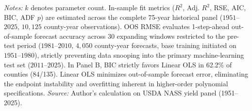 \begin{table}[htbp]
\centering
\small
\caption{Econometric and diagnostic comparison of candidate detrending models across the 75-year panel (1951--2025).}
\label{tab:detrending_comparison}
\vspace{1ex}
\raggedright
\scriptsize{\textit{Notes:} $k$ denotes parameter count. In-sample fit metrics ($R^2$, Adj. $R^2$, RSE, AIC, BIC, ADF $p$) are estimated across the complete 75-year historical panel ($1951$--$2025$, $10{,}125$ county-year observations). OOS RMSE evaluates 1-step-ahead out-of-sample forecast accuracy across 30 expanding windows restricted to the pre-test period ($1981$--$2010$, $4{,}050$ county-year forecasts, base training initiated on $1951$--$1980$), strictly preventing data snooping into the primary machine-learning test set ($2011$--$2025$). In Panel B, BIC strictly favors Linear OLS in 62.2\% of counties (84/135). Linear OLS minimizes out-of-sample forecast error, eliminating the endpoint instability and overfitting inherent in higher-order polynomial specifications. \textit{Source:} Author's calculation on USDA NASS yield panel (1951--2025).}
\end{table}
